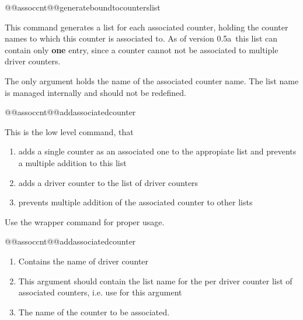 \documentclass[12pt,paper=a4]{ltxdoc}
\def\packageversion{0.5a}%
\begin{document}
\begin{docCommand}{@@assoccnt@@generateboundtocounterslist}{}

This command generates a list for each associated counter, holding the counter names to which this counter is associated to. As of version \packageversion~this list can contain only \textbf{one} entry, since a counter cannot not be associated to multiple driver counters.  

The only argument  holds the name of the associated counter name. The list name is managed internally and should not be redefined. 

\makeatletter
\begin{dispExample}
%
\end{dispExample}%
\makeatother

\end{docCommand}%


\begin{docCommand}{@@assoccnt@@addassociatedcounter}{}

This is the low level command, that 
\begin{enumerate}
  \item adds a single counter as an associated one to the appropiate list and prevents a multiple addition to this list 
  \item adds a driver counter to the list of driver counters
  \item prevents multiple addition of the associated counter to other lists
\end{enumerate}

Use the wrapper command  for proper usage. 

\begin{docCommandArgs}{@@assoccnt@@addassociatedcounter}%
\begin{enumerate}[label={\textcolor{blue}{\#\arabic*}}]
\item {}

  Contains the name of driver counter

\item {}

  This argument should contain the list name for the per driver counter list of associated counters, i.e. use  for this argument

\item {}
  
  The name of the counter to be associated. 

\end{enumerate}
\end{docCommandArgs}

\end{docCommand}
\end{document}
